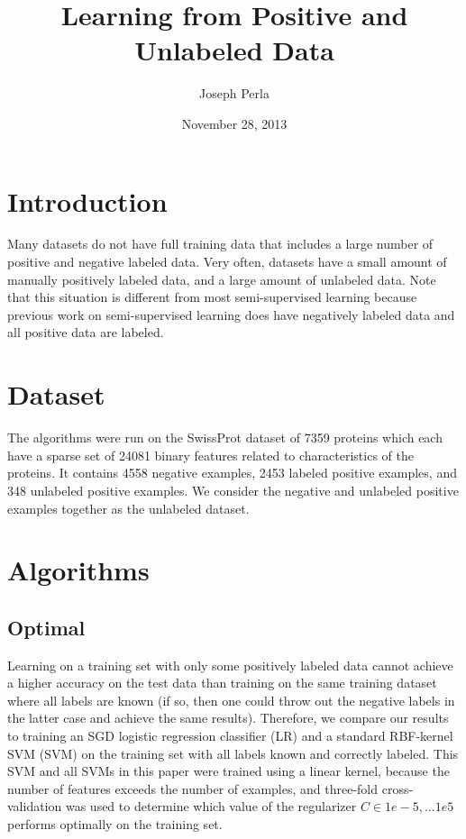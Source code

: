 \documentclass[]{article}
\begin{document}
\title{Learning from Positive and Unlabeled Data}
\author{Joseph Perla}
\date{November 28, 2013}
\maketitle

\section{Introduction}

Many datasets do not have full training data that includes a large number of positive and negative labeled data.  Very often, datasets have a small amount of manually positively labeled data, and a large amount of unlabeled data.  Note that this situation is different from most semi-supervised learning because previous work on semi-supervised learning does have negatively labeled data and all positive data are labeled.

\section{Dataset}

The algorithms were run on the SwissProt\cite{elkan08} dataset of 7359 proteins which each have a sparse set of 24081 binary features related to characteristics of the proteins. It contains 4558 negative examples, 2453 labeled positive examples, and 348 unlabeled positive examples.   We consider the negative and unlabeled positive examples together as the unlabeled dataset.

\section{Algorithms}

\subsection{Optimal}
Learning on a training set with only some positively labeled data cannot achieve a higher accuracy on the test data than training on the same training dataset where all labels are known (if so, then one could throw out the negative labels in the latter case and achieve the same results).  Therefore, we compare our results to training an SGD logistic regression classifier (LR) and a standard RBF-kernel SVM (SVM) on the training set with all labels known and correctly labeled.  This SVM and all SVMs in this paper were trained using a linear kernel, because the number of features exceeds the number of examples, and three-fold cross-validation was used to determine which value of the regularizer $C \in {1e-5, ... 1e5}$ performs optimally on the training set.
\end{document}
